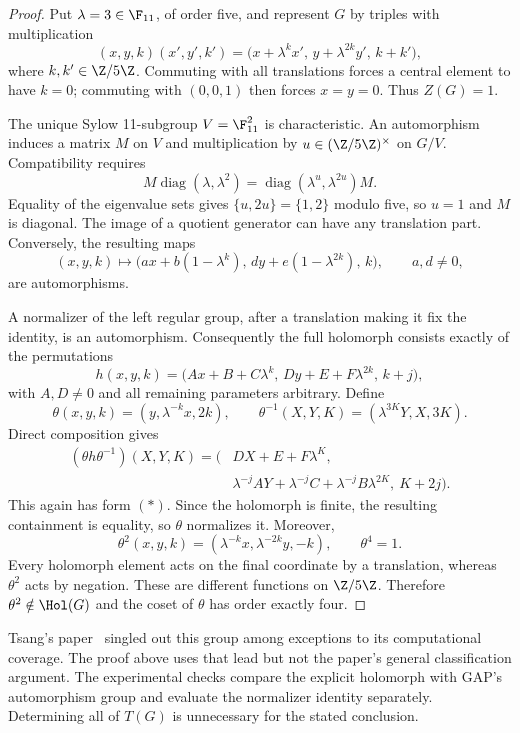 \begin{proof}
Put $\lambda=3\in\F_{11}$, of order five, and represent
$G$ by triples with multiplication
\[
(x,y,k)(x',y',k')
 =\bigl(x+\lambda^kx',\,y+\lambda^{2k}y',\,k+k'\bigr),
\]
where $k,k'\in\Z/5\Z$. Commuting with all translations
forces a central element to have $k=0$; commuting with
$(0,0,1)$ then forces $x=y=0$. Thus $Z(G)=1$.

The unique Sylow 11-subgroup $V=\F_{11}^2$ is
characteristic. An automorphism induces a matrix $M$
on $V$ and multiplication by
$u\in(\Z/5\Z)^\times$ on $G/V$. Compatibility requires
\[
M\operatorname{diag}(\lambda,\lambda^2)
 =\operatorname{diag}(\lambda^u,\lambda^{2u})M.
\]
Equality of the eigenvalue sets gives
$\{u,2u\}=\{1,2\}$ modulo five, so $u=1$ and $M$ is
diagonal. The image of a quotient generator can have
any translation part. Conversely, the resulting maps
\[
(x,y,k)\longmapsto
\bigl(ax+b(1-\lambda^k),\,
dy+e(1-\lambda^{2k}),\,k\bigr),
\qquad a,d\ne0,
\]
are automorphisms.

A normalizer of the left regular group, after a
translation making it fix the identity, is an
automorphism. Consequently the full holomorph consists
exactly of the permutations
\[
h(x,y,k)=
\bigl(Ax+B+C\lambda^k,\,
Dy+E+F\lambda^{2k},\,k+j\bigr),
\tag{$*$}
\]
with $A,D\ne0$ and all remaining parameters arbitrary.
Define
\[
\theta(x,y,k)=(y,\lambda^{-k}x,2k),\qquad
\theta^{-1}(X,Y,K)=(\lambda^{3K}Y,X,3K).
\]
Direct composition gives
\begin{align*}
(\theta h\theta^{-1})(X,Y,K)
 =\bigl(&DX+E+F\lambda^K,\\
        &\lambda^{-j}AY+\lambda^{-j}C+
                    \lambda^{-j}B\lambda^{2K},\ K+2j\bigr).
\end{align*}
This again has form $(*)$. Since the holomorph is finite,
the resulting containment is equality, so $\theta$ normalizes it.
Moreover,
\[
\theta^2(x,y,k)=(\lambda^{-k}x,\lambda^{-2k}y,-k),
\qquad \theta^4=1.
\]
Every holomorph element acts on the final coordinate
by a translation, whereas $\theta^2$ acts by negation.
These are different functions on $\Z/5\Z$. Therefore
$\theta^2\notin\Hol(G)$ and the coset of $\theta$ has
order exactly four.
\end{proof}

Tsang's paper~\cite{tsang} singled out this group among
exceptions to its computational coverage. The proof
above uses that lead but not the paper's general
classification argument. The experimental checks
compare the explicit holomorph with GAP's automorphism
group and evaluate the normalizer identity separately.
Determining all of $T(G)$ is unnecessary for the stated
conclusion.


